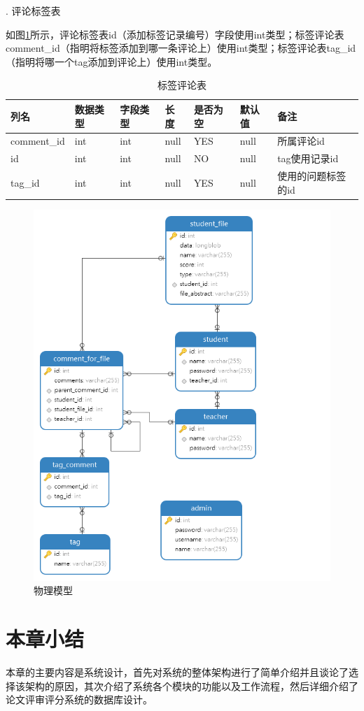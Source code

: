 .  评论标签表

如图\ref{db-tag-comment}所示，评论标签表id（添加标签记录编号）字段使用int类型；标签评论表comment\_id（指明将标签添加到哪一条评论上）使用int类型；标签评论表tag\_id（指明将哪一个tag添加到评论上）使用int类型。
\begin{table}[]
    \centering
    \song\wuhao
    \caption{标签评论表}
    \label{db-tag-comment}
    \begin{tabular}{lllllll}
        \hline
        列名        & 数据类型 & 字段类型 & 长度 & 是否为空 & 默认值 & 备注               \\ \hline
        comment\_id & int      & int      & null & YES      & null   & 所属评论id         \\
        id          & int      & int      & null & NO       & null   & tag使用记录id      \\
        tag\_id     & int      & int      & null & YES      & null   & 使用的问题标签的id \\ \hline
    \end{tabular}
\end{table}

\begin{figure}[htbp]
    \centering
    \includegraphics[scale = 0.6]{out/uml/数据库/physical-model.png}
    \caption{\song\wuhao 物理模型}
    \label{physical-model}
\end{figure}

\section{本章小结}

本章的主要内容是系统设计，首先对系统的整体架构进行了简单介绍并且谈论了选择该架构的原因，其次介绍了系统各个模块的功能以及工作流程，然后详细介绍了论文评审评分系统的数据库设计。
